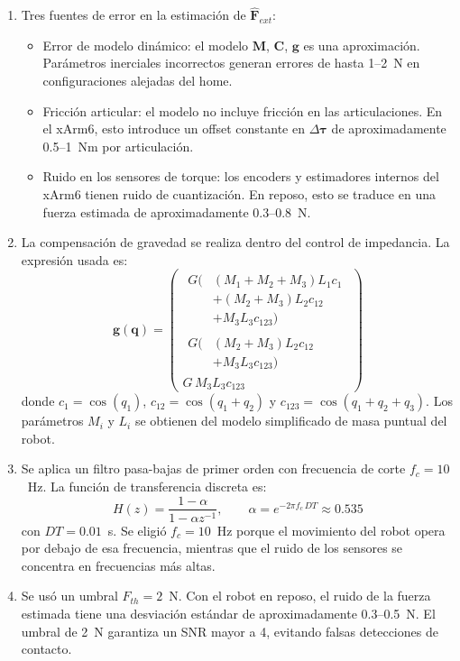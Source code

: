\documentclass[journal,10pt,twoside]{IEEEtran}
\begin{document}
\begin{enumerate}[label=(\alph*)]

\item Tres fuentes de error en la estimación de $\hat{\bm{F}}_{ext}$:
\begin{itemize}
    \item Error de modelo dinámico: el modelo $\bm{M}$, $\bm{C}$, $\bm{g}$
    es una aproximación. Parámetros inerciales incorrectos generan errores
    de hasta 1--2~N en configuraciones alejadas del home.
    \item Fricción articular: el modelo no incluye fricción en las
    articulaciones. En el xArm6, esto introduce un offset constante en
    $\Delta\bm{\tau}$ de aproximadamente 0.5--1~Nm por articulación.
    \item Ruido en los sensores de torque: los encoders y estimadores
    internos del xArm6 tienen ruido de cuantización. En reposo, esto
    se traduce en una fuerza estimada de aproximadamente 0.3--0.8~N.
\end{itemize}

\item La compensación de gravedad se realiza dentro del control de
impedancia. La expresión usada es:
\[
\bm{g}(\bm{q}) =
\begin{pmatrix}
\begin{aligned}
G\bigl(& (M_1+M_2+M_3)L_1c_1 \\
       & + (M_2+M_3)L_2c_{12} \\
       & + M_3L_3c_{123} \bigr)
\end{aligned}
\\[6pt]
\begin{aligned}
G\bigl(& (M_2+M_3)L_2c_{12} \\
       & + M_3L_3c_{123} \bigr)
\end{aligned}
\\[6pt]
G\,M_3L_3c_{123}
\end{pmatrix}
\]
donde $c_1=\cos(q_1)$, $c_{12}=\cos(q_1+q_2)$ y
$c_{123}=\cos(q_1+q_2+q_3)$. Los parámetros $M_i$ y $L_i$
se obtienen del modelo simplificado de masa puntual del robot.

\item Se aplica un filtro pasa-bajas de primer orden con frecuencia
de corte $f_c = 10$~Hz. La función de transferencia discreta es:
\[
H(z) = \frac{1-\alpha}{1 - \alpha z^{-1}}, \qquad
\alpha = e^{-2\pi f_c \, DT} \approx 0.535
\]
con $DT = 0.01$~s. Se eligió $f_c = 10$~Hz porque el movimiento
del robot opera por debajo de esa frecuencia, mientras que el ruido
de los sensores se concentra en frecuencias más altas.

\item Se usó un umbral $F_{th} = 2$~N. Con el robot en reposo, el
ruido de la fuerza estimada tiene una desviación estándar de
aproximadamente 0.3--0.5~N. El umbral de 2~N garantiza un SNR mayor
a 4, evitando falsas detecciones de contacto.

\end{enumerate}
\end{document}
